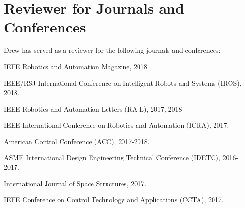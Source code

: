 \documentclass[letterpaper]{deedy-resume} %
\begin{document}
\sectionspace %


  


\section{Reviewer for Journals and Conferences}

\vspace{0.2cm}

Drew has served as a reviewer for the following journals and conferences:

\vspace{0.2cm}

\begin{tightitemize}

\item IEEE Robotics and Automation Magazine, 2018

\item IEEE/RSJ International Conference on Intelligent Robots and Systems (IROS), 2018.

\item IEEE Robotics and Automation Letters (RA-L), 2017, 2018
  
\item IEEE International Conference on Robotics and Automation (ICRA), 2017.

\item American Control Conference (ACC), 2017-2018.

\item ASME International Design Engineering Technical Conference (IDETC), 2016-2017.

\item International Journal of Space Structures, 2017.

\item IEEE Conference on Control Technology and Applications (CCTA), 2017.

\end{tightitemize}
\end{document}
